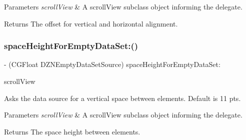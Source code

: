 \begin{DoxyParams}{Parameters}
{\em scroll\+View} & A scroll\+View subclass object informing the delegate. \\
\hline
\end{DoxyParams}
\begin{DoxyReturn}{Returns}
The offset for vertical and horizontal alignment. 
\end{DoxyReturn}
\mbox{\label{protocol_d_z_n_empty_data_set_source_01-p_a42f883a1104a351ee8b83e536d5c70a0}} 
\subsubsection{\texorpdfstring{space\+Height\+For\+Empty\+Data\+Set\+:()}{spaceHeightForEmptyDataSet:()}}
{\footnotesize\ttfamily -\/ (C\+G\+Float D\+Z\+N\+Empty\+Data\+Set\+Source) space\+Height\+For\+Empty\+Data\+Set\+: \begin{DoxyParamCaption}\item[{(U\+I\+Scroll\+View $\ast$)}]{scroll\+View }\end{DoxyParamCaption}\hspace{0.3cm}{\ttfamily [optional]}}

Asks the data source for a vertical space between elements. Default is 11 pts.


\begin{DoxyParams}{Parameters}
{\em scroll\+View} & A scroll\+View subclass object informing the delegate. \\
\hline
\end{DoxyParams}
\begin{DoxyReturn}{Returns}
The space height between elements. 
\end{DoxyReturn}
\mbox{\label{protocol_d_z_n_empty_data_set_source_01-p_a90d3eb4ef397bbd2f407efe1c4e4136f}} 
